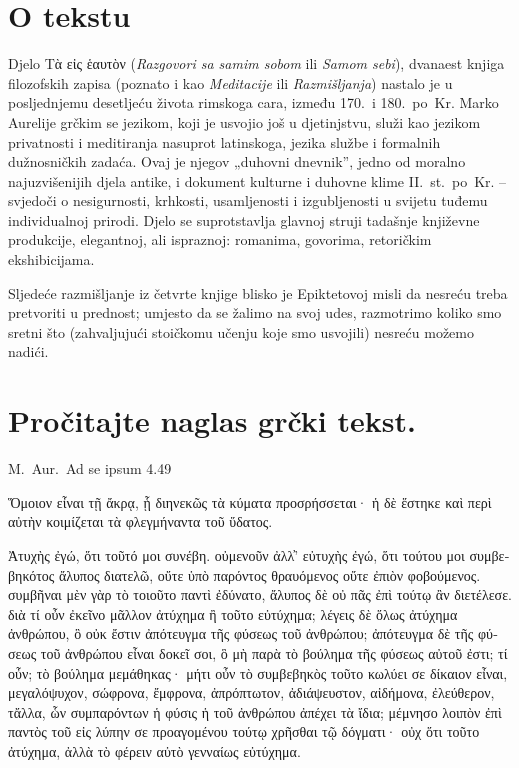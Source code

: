 

\section*{O tekstu}

Djelo \textgreek[variant=ancient]{Τὰ εἰς ἑαυτὸν} (\textit{Razgovori sa samim sobom} ili \textit{Samom sebi}),  dvanaest knjiga filozofskih zapisa (poznato i kao \textit{Meditacije} ili \textit{Razmišljanja}) nastalo je u posljednjemu desetljeću života rimskoga cara, između 170.\ i 180.\ po~Kr. Marko Aurelije grčkim se jezikom, koji je usvojio još u djetinjstvu, služi kao jezikom privatnosti i meditiranja nasuprot latinskoga, jezika službe i formalnih dužnosničkih zadaća. Ovaj je njegov „duhovni dnevnik'', jedno od moralno najuzvišenijih djela antike, i dokument kulturne i duhovne klime II.~st.\ po~Kr. – svjedoči o nesigurnosti, krhkosti, usamljenosti i izgubljenosti u svijetu tuđemu individualnoj prirodi. Djelo se suprotstavlja glavnoj struji tadašnje književne produkcije, elegantnoj, ali ispraznoj: romanima, govorima, retoričkim ekshibicijama.

Sljedeće razmišljanje iz četvrte knjige blisko je Epiktetovoj misli da nesreću treba pretvoriti u prednost; umjesto da se žalimo na svoj udes, razmotrimo koliko smo sretni što (zahvaljujući stoičkomu učenju koje smo usvojili) nesreću možemo nadići.

\newpage

\section*{Pročitajte naglas grčki tekst.}

M.\ Aur.\ Ad se ipsum 4.49


\medskip


{\large

\begin{greek}

\noindent Ὅμοιον εἶναι τῇ ἄκρᾳ, ᾗ διηνεκῶς τὰ κύματα προσρήσσεται· ἡ δὲ ἕστηκε καὶ περὶ αὐτὴν κοιμίζεται τὰ φλεγμήναντα τοῦ ὕδατος. 

\noindent Ἀτυχὴς ἐγώ, ὅτι τοῦτό μοι συνέβη. οὐμενοῦν ἀλλ̓' εὐτυχὴς ἐγώ, ὅτι τούτου μοι συμβεβηκότος ἄλυπος διατελῶ, οὔτε ὑπὸ παρόντος θραυόμενος οὔτε ἐπιὸν φοβούμενος. συμβῆναι μὲν γὰρ τὸ τοιοῦτο παντὶ ἐδύνατο, ἄλυπος δὲ οὐ πᾶς ἐπὶ τούτῳ ἂν διετέλεσε. διὰ τί οὖν ἐκεῖνο μᾶλλον ἀτύχημα ἢ τοῦτο εὐτύχημα; λέγεις δὲ ὅλως ἀτύχημα ἀνθρώπου, ὃ οὐκ ἔστιν ἀπότευγμα τῆς φύσεως τοῦ ἀνθρώπου; ἀπότευγμα δὲ τῆς φύσεως τοῦ ἀνθρώπου εἶναι δοκεῖ σοι, ὃ μὴ παρὰ τὸ βούλημα τῆς φύσεως αὐτοῦ ἐστι; τί οὖν; τὸ βούλημα μεμάθηκας· μήτι οὖν τὸ συμβεβηκὸς τοῦτο κωλύει σε δίκαιον εἶναι, μεγαλόψυχον, σώφρονα, ἔμφρονα, ἀπρόπτωτον, ἀδιάψευστον, αἰδήμονα, ἐλεύθερον, τἄλλα, ὧν συμπαρόντων ἡ φύσις ἡ τοῦ ἀνθρώπου ἀπέχει τὰ ἴδια; μέμνησο λοιπὸν ἐπὶ παντὸς τοῦ εἰς λύπην σε προαγομένου τούτῳ χρῆσθαι τῷ δόγματι· οὐχ ὅτι τοῦτο ἀτύχημα, ἀλλὰ τὸ φέρειν αὐτὸ γενναίως εὐτύχημα.

\end{greek}

}


